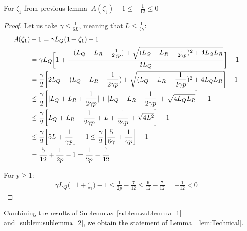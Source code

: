 \begin{sublemma}\label{sublem:sublemma_2}
    For $\zeta_1$ from previous lemma: $A(\zeta_1) - 1 \leq -\frac{1}{12} \leq 0$
\end{sublemma}
\begin{proof}
    Let us take $\gamma \leq \frac{1}{6 L}$, meaning that $L \leq \frac{1}{6 \gamma }$:
    \begin{align}
        A(\zeta_1)& - 1 = \gamma L_Q(1+\zeta_1) - 1 \\
        &= \gamma L_Q 
        \biggr[ 1 + \frac{-(L_Q - L_R - \frac{1}{2\gamma p})+\sqrt{(L_Q - L_R -\frac{1}{2\gamma p})^2 + 4 L_Q L_R}}{2L_Q}  \biggr] - 1\\
        &=
        \frac{\gamma}{2} 
        \biggr[ 2L_Q - (L_Q - L_R - \frac{1}{2\gamma p}) + \sqrt{(L_Q - L_R - \frac{1}{2\gamma p})^2 + 4 L_Q L_R}  \biggr] - 1\\ 
        & \leq
        \frac{\gamma}{2} 
        \biggr[ |L_Q + L_R + \frac{1}{2\gamma p}| + |L_Q - L_R - \frac{1}{2\gamma p}| + \sqrt{ 4 L_Q L_R}  \biggr] - 1\\
        & \leq
        \frac{\gamma}{2} 
        \biggr[ L_Q + L_R + \frac{1}{2\gamma p} + L + \frac{1}{2\gamma p} + \sqrt{ 4 L^2}  \biggr] - 1\\
        & \leq
        \frac{\gamma}{2} 
        \biggr[ 5 L + \frac{1}{\gamma p}  \biggr] - 1
        \leq
        \frac{\gamma}{2} 
        \biggr[ \frac{5}{6 \gamma} + \frac{1}{\gamma p}  \biggr] - 1 \\
        &=
        \frac{5}{12} + \frac{1}{2p} - 1
        = \frac{1}{2p} - \frac{7}{12}
    \end{align}
    
    For $p \geq 1$:
    \begin{align}
         \gamma L_Q(&1+\zeta_1) - 1 \leq \frac{1}{2p} - \frac{7}{12} \leq \frac{6}{12} - \frac{7}{12} 
         = -\frac{1}{12} < 0 \label{eq:St_6}
    \end{align}
\end{proof}

Combining the results of Sublemmas~\ref{sublem:sublemma_1} and~\ref{sublem:sublemma_2}, 
we obtain the statement of Lemma ~\ref{lem:Technical}.

